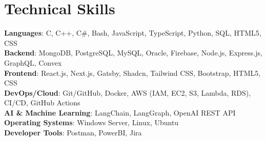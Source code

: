 \documentclass[letterpaper,11pt]{article}
\begin{document}
\section{Technical Skills}
\begin{itemize}[leftmargin=0.15in, label={}]
    \small{
        \item{
            \textbf{Languages}{: C, C++, C\#, Bash, JavaScript, TypeScript, Python, SQL, HTML5, CSS} \\[1mm]
            \textbf{Backend}{: MongoDB, PostgreSQL, MySQL, Oracle, Firebase, Node.js, Express.js, GraphQL, Convex} \\[1mm]
            \textbf{Frontend}{: React.js, Next.js, Gatsby, Shadcn, Tailwind CSS, Bootstrap, HTML5, CSS} \\[1mm]
            \textbf{DevOps/Cloud}{: Git/GitHub, Docker, AWS (IAM, EC2, S3, Lambda, RDS), CI/CD, GitHub Actions} \\[1mm]
            \textbf{AI \& Machine Learning}{: LangChain, LangGraph, OpenAI REST API} \\[1mm]
            \textbf{Operating Systems}{: Windows Server, Linux, Ubuntu} \\[1mm]
            \textbf{Developer Tools}{: Postman, PowerBI, Jira}
        }
    }
\end{itemize}

 \vspace{-16pt}
 \vspace{3pt}
\vspace{10pt}

\vspace{-15pt}
\end{document}

